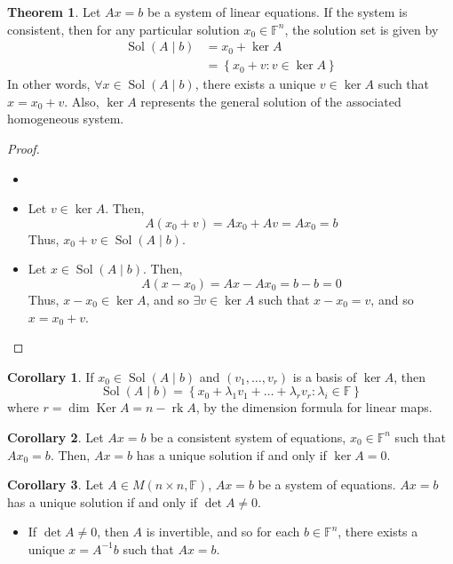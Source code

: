 \documentclass[letterpaper,12pt]{article}
\theoremstyle{definition}
\newtheorem*{theorem}{Theorem}
\newtheorem*{corollary}{Corollary}
\newcommand{\set}[1]{\left\{ #1 \right\}}
\DeclareMathOperator{\Ker}{Ker}
\DeclareMathOperator{\rk}{rk}
\DeclareMathOperator{\sol}{Sol}
\begin{document}
\begin{theorem}
Let $Ax = b$ be a system of linear equations. If the system is consistent, then for any particular solution $x_0 \in \mathbb{F}^n$, the solution set is given by
\begin{align*}
    \sol{(A \mid b)} & = x_0 + \ker{A} \\
    & = \set{x_0 + v: v \in \ker{A}}
\end{align*}
In other words, $\forall x \in \sol{(A \mid b)}$, there exists a unique $v \in \ker{A}$ such that $x = x_0 + v$. Also, $\ker{A}$ represents the general solution of the associated homogeneous system.
\end{theorem}
\begin{proof}
\begin{itemize}
    \item[]
    \item Let $v \in \ker{A}$. Then,
    \begin{equation*}
        A(x_0 + v) = Ax_0 + Av = Ax_0 = b
    \end{equation*}
    Thus, $x_0 + v \in \sol{(A \mid b)}$.
    \item Let $x \in \sol{(A \mid b)}$. Then,
    \begin{equation*}
        A(x - x_0) = Ax - Ax_0 = b - b = 0
    \end{equation*}
    Thus, $x - x_0 \in \ker{A}$, and so $\exists v \in \ker{A}$ such that $x - x_0 = v$, and so $x = x_0 + v$.
\end{itemize}
\end{proof}

\begin{corollary}
If $x_0 \in \sol{(A \mid b)}$ and $(v_1, \dots, v_r)$ is a basis of $\ker{A}$, then
\begin{equation*}
    \sol{(A \mid b)} = \set{x_0 + \lambda_1 v_1 + \dots + \lambda_r v_r : \lambda_i \in \mathbb{F}}
\end{equation*}
where $r = \dim{\Ker{A}} = n - \rk{A}$, by the dimension formula for linear maps.
\end{corollary}

\begin{corollary}
Let $Ax = b$ be a consistent system of equations, $x_0 \in \mathbb{F}^n$ such that $Ax_0 = b$. Then, $Ax = b$ has a unique solution if and only if $\ker{A} = 0$.
\end{corollary}

\begin{corollary}
Let $A \in M(n \times n, \mathbb{F})$, $Ax = b$ be a system of equations. $Ax = b$ has a unique solution if and only if $\det{A} \neq 0$.
\begin{itemize}
    \item If $\det{A} \neq 0$, then $A$ is invertible, and so for each $b \in \mathbb{F}^n$, there exists a unique $x = A^{-1} b$ such that $Ax = b$.
\end{itemize}
\end{corollary}
\end{document}
